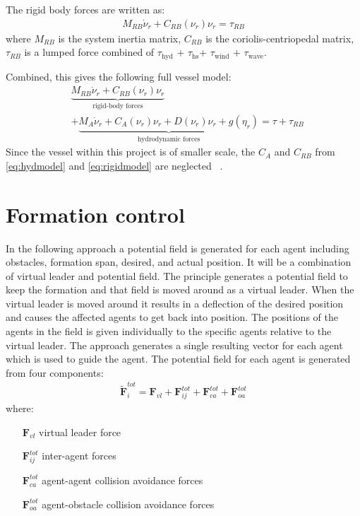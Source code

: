\documentclass[conference]{IEEEtran}
\begin{document}
The rigid body forces are written as:
\begin{align}
M_{RB} \dot \nu_r + C_{RB}(\nu_r)\nu_r = \tau_{RB}
\label{eq:rigidmodel}
\end{align}
where $M_{RB}$ is the system inertia matrix, $C_{RB}$ is the coriolis-centriopedal matrix, $\tau_{RB}$ is a lumped force combined of $\tau_{\text{hyd}}$ + $\tau_{\text{hs}}$+ $\tau_{\text{wind}}$ + $\tau_{\text{wave}}$.

Combined, this gives the following full vessel model:
\begin{align}
&\underbrace{M_{RB} \dot \nu_r + C_{RB}(\nu_r)\nu_r}_{\text{rigid-body forces}}\\\nonumber
&+ \underbrace{M_A \dot \nu_r + C_A(\nu_r)\nu_r + D(\nu_r)\nu_r + g(\eta_r)}_{\text{hydrodynamic forces}}  = \tau + \tau_{RB}
\label{eq:totmodel}
\end{align}
Since the vessel within this project is of smaller scale, the $C_A$ and $C_{RB}$ from \ref{eq:hydmodel} and \ref{eq:rigidmodel} are neglected ~\citep[eq. (2.23)]{fullactuatship}.



\section{Formation control}
\label{sc:one-approach}
In the following approach a potential field is generated for each
agent including obstacles, formation span, desired, and actual
position.  It will be a combination of virtual leader and potential
field. The principle generates a potential field to keep the formation
and that field is moved around as a virtual leader. When the virtual
leader is moved around it results in a deflection of the desired
position and causes the affected agents to get back into position. The
positions of the agents in the field is given individually to the
specific agents relative to the virtual leader. The approach generates
a single resulting vector for each agent which is used to guide the
agent. The potential field for each agent is generated from four
components:
\begin{align}
\tilde{\mathbf{F}}_i^{tot} = \mathbf{F}_{vl}+\mathbf{F}_{ij}^{tot}+\mathbf{F}_{ca}^{tot}+\mathbf{F}_{oa}^{tot}
\end{align}
where:
\begin{itemize}
\item[$\mathbf{F}_{vl}$] virtual leader force
\item[$\mathbf{F}_{ij}^{tot}$] inter-agent forces
\item[$\mathbf{F}_{ca}^{tot}$] agent-agent collision avoidance forces
\item[$\mathbf{F}_{oa}^{tot}$] agent-obstacle collision avoidance forces
\end{itemize}
\end{document}

